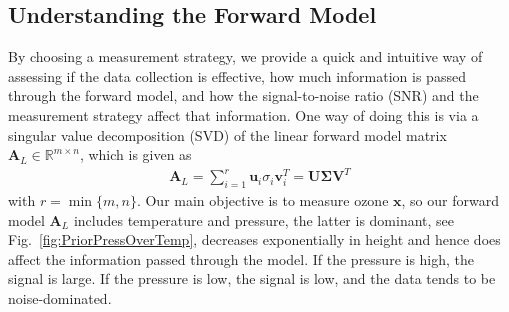 \subsection{Understanding the Forward Model}
\label{sec:SVD}
By choosing a measurement strategy, we provide a quick and intuitive way of assessing if the data collection is effective, how much information is passed through the forward model, and how the signal-to-noise ratio (SNR) and the measurement strategy affect that information.
One way of doing this is via a singular value decomposition (SVD) of the linear forward model matrix $\bm{A}_L \in \mathbb{R}^{m \times n}$, which is given as
\begin{align}
	\bm{A}_L = \sum_{i =1}^{r} \bm{u}_i  \sigma_i \bm{v}^T_i = \bm{U} \bm{\Sigma} \bm{V}^T
\end{align}
with $r = \min\{m,n\}$.
Our main objective is to measure ozone $\bm{x}$, so our forward model $\bm{A}_L$ includes temperature and pressure, the latter is dominant, see Fig.~\ref{fig:PriorPressOverTemp}, decreases exponentially in height and hence does affect the information passed through the model.
If the pressure is high, the signal is large.
If the pressure is low, the signal is low, and the data tends to be noise-dominated.

